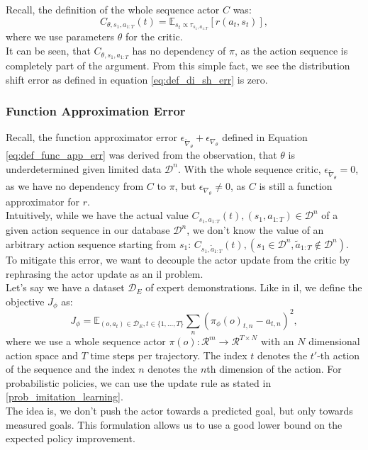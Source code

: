 Recall, the definition of the whole sequence actor $C$ was: 
$$C_{\theta, s_1, a_{1:T}}(t) = \mathbb{E}_{s_t \propto \tau_{s_1, a_{1:T}}}\left[r(a_t, s_t)\right],$$
where we use parameters $\theta$ for the critic.\\
It can be seen, that $C_{\theta, s_1, a_{1:T}}$ has no dependency of $\pi$, as the action sequence is completely part of the argument. From this simple fact, we 
see the distribution shift error as defined in equation \ref{eq:def_di_sh_err} is zero. 

\subsubsection{Function Approximation Error}
\label{func_app_error}
Recall, the function approximator error $\epsilon_{\widetilde{\nabla}_{\theta}} + \epsilon_{\nabla_{\theta}}$ defined in Equation \ref{eq:def_func_app_err} was 
derived from the observation, that $\theta$ is underdetermined 
given limited data $\mathcal{D}^n$. With the whole sequence critic, $\epsilon_{\widetilde{\nabla}_{\theta}} = 0$, as we have no dependency from $C$ to $\pi$, 
but $\epsilon_{\nabla_{\theta}} \neq 0$, as $C$ is still a function approximator for $r$.\\

Intuitively, while we have the actual value $C_{s_1, a_{1:T}}(t), (s_1, a_{1:T}) \in \mathcal{D}^n$ of a given action sequence in our database $\mathcal{D}^n$, 
we don't know the value of an arbitrary action sequence starting from $s_1$: $C_{s_1, \tilde{a}_{1:T}}(t), (s_1 \in \mathcal{D}^n, \tilde{a}_{1:T} \notin \mathcal{D}^n)$. \\
To mitigate this error, we want to decouple the actor update from the critic by rephrasing the actor update as an \ac{il} problem. \\
Let's say we have a dataset $\mathcal{D}_E$ of expert demonstrations. Like in \ac{il}, we define the objective $J_{\phi}$ as:
\begin{equation}
    \label{eq:ac_obj_1}
    J_{\phi} = \mathbb{E}_{(o, a_{t}) \in \mathcal{D}_E, t \in \{1, ..., T\}}\sum_n \left(\pi_{\phi}(o)_{t, n} - a_{t, n}\right)^2,
\end{equation}
where we use a whole sequence actor 
$\pi(o):\mathcal{R}^m \rightarrow \mathcal{R}^{T \times N}$ with an $N$ dimensional action space and $T$ time steps per trajectory. The index $t$ denotes the $t'$-th action of the sequence and the index $n$ denotes the $n$th dimension of 
the action. For probabilistic policies, we can use the update rule as stated in \ref{prob_imitation_learning}.\\ 
The idea is, we don't push the actor towards a predicted goal, 
but only towards measured goals. This formulation allows us to use a good lower bound on the expected policy improvement.\\

